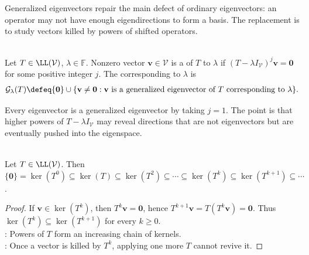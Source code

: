 Generalized eigenvectors repair the main defect of ordinary eigenvectors: an operator may not have enough eigendirections to form a basis. The replacement is to study vectors killed by powers of shifted operators.

\begin{definition} \label{def:generalized-eigenvector-and-eigenspace} \\
Let $T\in\LL(\mathcal{V})$, $\lambda\in\mathbb{F}$. Nonzero vector $\mathbf{v}\in\mathcal{V}$ is a  of $T$ to $\lambda$ if $(T-\lambda I_{\mathcal{V}})^j\mathbf{v}=\mathbf{0}$ for some positive integer $j$. The  corresponding to $\lambda$ is
\begin{align}
\mathcal{G}_{\lambda}(T)\defeq \{\mathbf{0}\}\cup\{\mathbf{v}\neq\mathbf{0}:\mathbf{v}\text{ is a generalized eigenvector of }T\text{ corresponding to }\lambda\}.
\nonumber
\end{align}
\end{definition}

Every eigenvector is a generalized eigenvector by taking $j=1$. The point is that higher powers of $T-\lambda I_{\mathcal{V}}$ may reveal directions that are not eigenvectors but are eventually pushed into the eigenspace.

\begin{proposition} \label{prop:kernels-of-powers-increase} \\
Let $T\in\LL(\mathcal{V})$. Then $\{\mathbf{0}\}=\ker(T^0)\subseteq\ker(T)\subseteq\ker(T^2)\subseteq\cdots\subseteq\ker(T^k)\subseteq\ker(T^{k+1})\subseteq\cdots$.
\begin{proof}
If $\mathbf{v}\in\ker(T^k)$, then $T^k\mathbf{v}=\mathbf{0}$, hence $T^{k+1}\mathbf{v}=T(T^k\mathbf{v})=\mathbf{0}$. Thus $\ker(T^k)\subseteq\ker(T^{k+1})$ for every $k\geq0$.\\
: Powers of $T$ form an increasing chain of kernels.\\
: Once a vector is killed by $T^k$, applying one more $T$ cannot revive it.
\end{proof}
\end{proposition}

